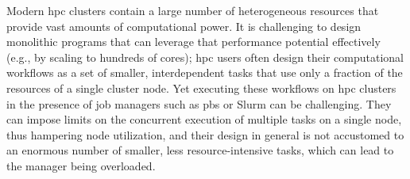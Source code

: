 %
%
%
%

Modern \gls{hpc} clusters contain a large number of heterogeneous resources that
provide vast amounts of computational power. It is challenging to design monolithic programs that
can leverage that performance potential effectively (e.g., by scaling to hundreds of cores);
\gls{hpc} users often design their computational workflows as a set of smaller,
interdependent tasks that use only a fraction of the resources of a single cluster node. Yet
executing these workflows on \gls{hpc} clusters in the presence of job managers such
as \gls{pbs} or Slurm can be challenging. They can impose limits on the concurrent
execution of multiple tasks on a single node, thus hampering node utilization, and their design in
general is not accustomed to an enormous number of smaller, less resource-intensive tasks, which
can lead to the manager being overloaded.
